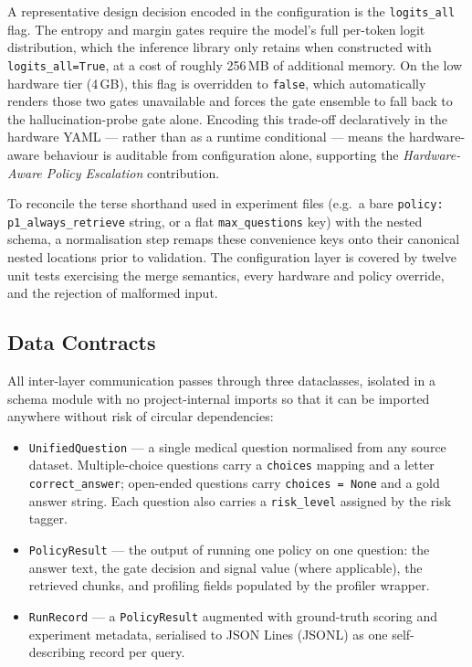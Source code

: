 A representative design decision encoded in the configuration is the
\texttt{logits\_all} flag. The entropy and margin gates require the model's
full per-token logit distribution, which the inference library only retains
when constructed with \texttt{logits\_all=True}, at a cost of roughly
256\,MB of additional memory. On the low hardware tier (4\,GB), this flag is
overridden to \texttt{false}, which automatically renders those two gates
unavailable and forces the gate ensemble to fall back to the
hallucination-probe gate alone. Encoding this trade-off declaratively in the
hardware YAML --- rather than as a runtime conditional --- means the
hardware-aware behaviour is auditable from configuration alone, supporting
the \emph{Hardware-Aware Policy Escalation} contribution.

To reconcile the terse shorthand used in experiment files (e.g.\ a bare
\texttt{policy: p1\_always\_retrieve} string, or a flat
\texttt{max\_questions} key) with the nested schema, a normalisation step
remaps these convenience keys onto their canonical nested locations prior to
validation. The configuration layer is covered by twelve unit tests
exercising the merge semantics, every hardware and policy override, and the
rejection of malformed input.

\subsection{Data Contracts}
\label{sec:impl-schema}

All inter-layer communication passes through three dataclasses, isolated in a
schema module with no project-internal imports so that it can be imported
anywhere without risk of circular dependencies:

\begin{itemize}
  \item \texttt{UnifiedQuestion} --- a single medical question normalised from
        any source dataset. Multiple-choice questions carry a
        \texttt{choices} mapping and a letter \texttt{correct\_answer};
        open-ended questions carry \texttt{choices = None} and a gold answer
        string. Each question also carries a \texttt{risk\_level} assigned by
        the risk tagger.
  \item \texttt{PolicyResult} --- the output of running one policy on one
        question: the answer text, the gate decision and signal value (where
        applicable), the retrieved chunks, and profiling fields populated by
        the profiler wrapper.
  \item \texttt{RunRecord} --- a \texttt{PolicyResult} augmented with
        ground-truth scoring and experiment metadata, serialised to JSON Lines
        (JSONL) as one self-describing record per query.
\end{itemize}

